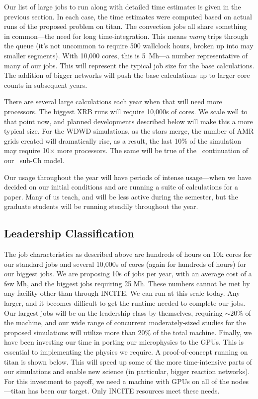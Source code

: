Our list of large jobs to run along with detailed time estimates is given in
the previous section.  In each case, the time estimates
were computed based on actual runs of the proposed problem on titan.
The convection jobs all share something in common---the need for long
time-integration.  This means {\em many} trips through the queue (it's
not uncommon to require 500 wallclock hours, broken up into may
smaller segments).  With 10,000 cores, this is 5~Mh---a number
representative of many of our jobs.  This will represent the typical
job size for the base calculations.  The addition of bigger networks
will push the base calculations up to larger core counts in subsequent
years.

There are several large calculations each year when that will need more
processors.  The biggest XRB runs will require 10,000s of cores.  We
scale well to that point now, and planned developments described
below will make this a more typical size.  For the WDWD simulations,
as the stars merge, the number of AMR grids created will dramatically
rise, as a result, the last 10\% of the simulation may require
10$\times$ more processors.  The same will be true of the
\castro\ continuation of our \maestro\ sub-Ch model.

Our usage throughout the year will have periods of intense
usage---when we have decided on our initial conditions and are running
a suite of calculations for a paper.  Many of us teach, and will be
less active during the semester, but the graduate students will be running
steadily throughout the year.


\subsection{Leadership Classification}

The job characteristics as described above are hundreds of hours on
10k cores for our standard jobs and several 10,000s of cores (again
for hundreds of hours) for our biggest jobs.  We are proposing 10s of
jobs per year, with an average cost of a few Mh, and the biggest jobs
requiring 25 Mh.  These numbers cannot be met by any facility other
than through INCITE.  We can run at this scale today.  Any larger, and
it becomes difficult to get the runtime needed to complete our jobs.
Our largest jobs will be on the leadership class by themselves,
requiring $\sim 20$\% of the machine, and our wide range of concurrent
moderately-sized studies for the proposed simulations will utilize
more than 20\% of the total machine.  Finally, we have been investing
our time in porting our microphysics to the GPUs.  This is essential
to implementing the physics we require.  A proof-of-concept
running on titan is shown below.  This will speed up some of the more
time-intensive parts of our simulations and enable new science (in
particular, bigger reaction networks).  For this investment to payoff,
we need a machine with GPUs on all of the nodes---titan has been our
target.  Only INCITE resources meet these needs.

